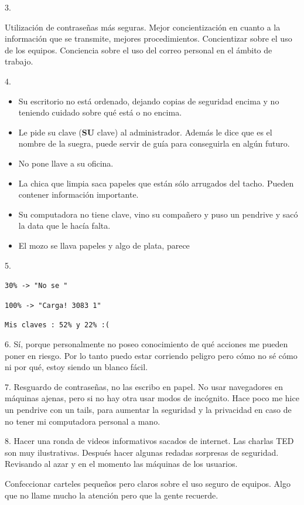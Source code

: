3.

Utilización de contraseñas más seguras. Mejor concientización en cuanto a la información que se transmite, mejores procedimientos. Concientizar sobre el uso de los equipos. Conciencia sobre el uso del correo personal en el ámbito de trabajo.

4.

\begin{itemize}
    \item Su escritorio no está ordenado, dejando copias de seguridad encima y no teniendo cuidado sobre qué está o no encima.
    \item Le pide su clave (\textbf{SU} clave) al administrador. Además le dice que es el nombre de la suegra, puede servir de guía para conseguirla en algún futuro.
    \item No pone llave a su oficina.
    \item La chica que limpia saca papeles que están sólo arrugados del tacho. Pueden contener información importante.
    \item Su computadora no tiene clave, vino su compañero y puso un pendrive y sacó la data que le hacía falta.
    \item El mozo se llava papeles y algo de plata, parece
\end{itemize}

5.

\texttt{30\% -> "No se "} 

\texttt{100\% -> "Carga! 3083 1"}

\texttt{Mis claves : 52\% y 22\% :(}

6. Sí, porque personalmente no poseo conocimiento de qué acciones me pueden poner en riesgo. Por lo tanto puedo estar corriendo peligro pero cómo no sé cómo ni por qué, estoy siendo un blanco fácil.

7. Resguardo de contraseñas, no las escribo en papel. No usar navegadores en máquinas ajenas, pero si no hay otra usar modos de incógnito. Hace poco me hice un pendrive con un tails, para aumentar la seguridad y la privacidad en caso de no tener mi computadora personal a mano.

8. Hacer una ronda de videos informativos sacados de internet. Las charlas TED son muy ilustrativas. Después hacer algunas redadas sorpresas de seguridad. Revisando al azar y en el momento las máquinas de los usuarios. 

Confeccionar carteles pequeños pero claros sobre el uso seguro de equipos. Algo que no llame mucho la atención pero que la gente recuerde.

